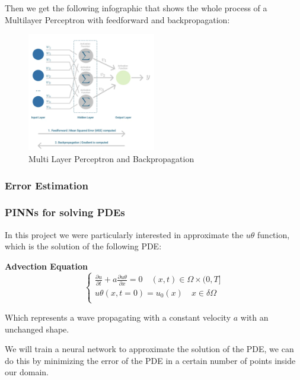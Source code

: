 \documentclass{article}
\begin{document}
Then we get the following infographic that shows the whole process of a Multilayer Perceptron with feedforward and backpropagation:
\begin{figure}[H]
    \centering
    \includegraphics[width=0.5\textwidth]{images/MLP2.png}
    \caption{Multi Layer Perceptron and Backpropagation}
\end{figure}

\subsubsection{Error Estimation}


\subsubsection{PINNs for solving PDEs} 


In this project we were particularly interested in approximate the $u\theta$ function, which is the solution of the following PDE:

\textbf{Advection Equation}
\begin{equation}
    \begin{cases}
    \frac{\partial u}{\partial t} + a \frac{\partial u\theta}{\partial x} = 0 \quad (x,t) \in \Omega \times (0,T] \\
    u\theta(x,t=0) = u_0(x) \quad x \in \delta \Omega \\
    \end{cases}
\end{equation}

Which represents a wave propagating with a constant velocity $a$ with an unchanged shape.

We will train a neural network to approximate the solution of the PDE, we can do this by minimizing the error of the PDE in a certain number of points inside our domain.
\end{document}
